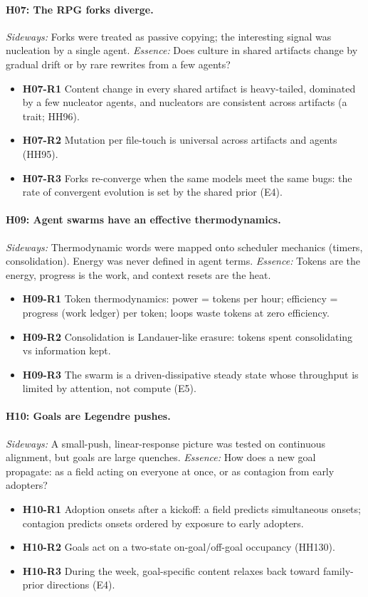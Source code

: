 \documentclass[aps,pre,reprint,10pt,nofootinbib]{revtex4-2}
\begin{document}
\paragraph{H07: The RPG forks diverge.} \emph{Sideways:} Forks were treated as passive copying; the interesting signal was nucleation by a single agent. \emph{Essence:} Does culture in shared artifacts change by gradual drift or by rare rewrites from a few agents?
\begin{itemize}\setlength{\itemsep}{0pt}
\item \textbf{H07-R1} Content change in every shared artifact is heavy-tailed, dominated by a few nucleator agents, and nucleators are consistent across artifacts (a trait; HH96).
\item \textbf{H07-R2} Mutation per file-touch is universal across artifacts and agents (HH95).
\item \textbf{H07-R3} Forks re-converge when the same models meet the same bugs: the rate of convergent evolution is set by the shared prior (E4).
\end{itemize}
\paragraph{H09: Agent swarms have an effective thermodynamics.} \emph{Sideways:} Thermodynamic words were mapped onto scheduler mechanics (timers, consolidation). Energy was never defined in agent terms. \emph{Essence:} Tokens are the energy, progress is the work, and context resets are the heat.
\begin{itemize}\setlength{\itemsep}{0pt}
\item \textbf{H09-R1} Token thermodynamics: power = tokens per hour; efficiency = progress (work ledger) per token; loops waste tokens at zero efficiency.
\item \textbf{H09-R2} Consolidation is Landauer-like erasure: tokens spent consolidating vs information kept.
\item \textbf{H09-R3} The swarm is a driven-dissipative steady state whose throughput is limited by attention, not compute (E5).
\end{itemize}
\paragraph{H10: Goals are Legendre pushes.} \emph{Sideways:} A small-push, linear-response picture was tested on continuous alignment, but goals are large quenches. \emph{Essence:} How does a new goal propagate: as a field acting on everyone at once, or as contagion from early adopters?
\begin{itemize}\setlength{\itemsep}{0pt}
\item \textbf{H10-R1} Adoption onsets after a kickoff: a field predicts simultaneous onsets; contagion predicts onsets ordered by exposure to early adopters.
\item \textbf{H10-R2} Goals act on a two-state on-goal/off-goal occupancy (HH130).
\item \textbf{H10-R3} During the week, goal-specific content relaxes back toward family-prior directions (E4).
\end{itemize}
\end{document}
